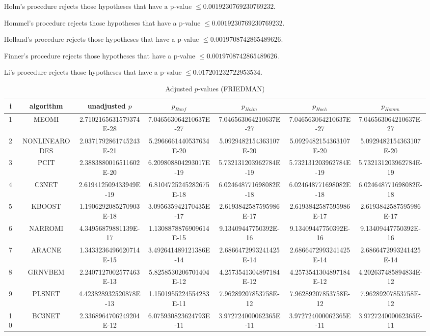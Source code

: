\documentclass[a4paper,10pt]{article}
\begin{document}
\begin{landscape}
Holm's procedure rejects those hypotheses that have a p-value $\le0.0019230769230769232$.


Hommel's procedure rejects those hypotheses that have a p-value $\le0.0019230769230769232$.


Holland's procedure rejects those hypotheses that have a p-value $\le0.0019708742865489626$.


Finner's procedure rejects those hypotheses that have a p-value $\le0.0019708742865489626$.


Li's procedure rejects those hypotheses that have a p-value $\le0.017201232722953534$.



\newpage

\begin{table}[!htp]
\centering\scriptsize
\caption{Adjusted $p$-values (FRIEDMAN)}
\begin{tabular}{ccccccc}
i&algorithm&unadjusted $p$&$p_{Bonf}$&$p_{Holm}$&$p_{Hoch}$&$p_{Homm}$\\
\hline
1&MEOMI&2.7102165631579374E-28&7.046563064210637E-27&7.046563064210637E-27&7.046563064210637E-27&7.046563064210637E-27\\
2&NONLINEARODES&2.0371792861745243E-21&5.2966661440537634E-20&5.0929482154363107E-20&5.0929482154363107E-20&5.0929482154363107E-20\\
3&PCIT&2.3883880016511602E-20&6.209808804293017E-19&5.732131203962784E-19&5.732131203962784E-19&5.732131203962784E-19\\
4&C3NET&2.619412509433949E-19&6.8104725245282675E-18&6.024648771698082E-18&6.024648771698082E-18&6.024648771698082E-18\\
5&KBOOST&1.1906292085270903E-18&3.095635942170435E-17&2.6193842587595986E-17&2.6193842587595986E-17&2.6193842587595986E-17\\
6&NARROMI&4.34956879881139E-17&1.1308878876909614E-15&9.13409447750392E-16&9.13409447750392E-16&9.13409447750392E-16\\
7&ARACNE&1.3433236496620714E-15&3.492641489121386E-14&2.6866472993241425E-14&2.6866472993241425E-14&2.6866472993241425E-14\\
8&GRNVBEM&2.2407127002577463E-13&5.8258530206701404E-12&4.2573541304897184E-12&4.2573541304897184E-12&4.202637485894834E-12\\
9&PLSNET&4.423828932520878E-13&1.1501955224554283E-11&7.96289207853758E-12&7.96289207853758E-12&7.96289207853758E-12\\
10&BC3NET&2.3368964706249204E-12&6.075930823624793E-11&3.972724000062365E-11&3.972724000062365E-11&3.972724000062365E-11\\

\end{tabular}
\end{table}
\end{landscape}
\end{document}
